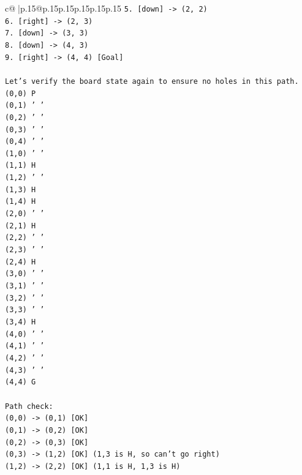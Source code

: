 \documentclass{article}
\begin{document}
{\begin{supertabular}{c@{$\;$}|p{.15\linewidth}@{}p{.15\linewidth}p{.15\linewidth}p{.15\linewidth}p{.15\linewidth}p{.15\linewidth}}
{{{\texttt{5. {[}down{]} {-}> (2, 2)} \\
\texttt{6. {[}right{]} {-}> (2, 3)} \\
\texttt{7. {[}down{]} {-}> (3, 3)} \\
\texttt{8. {[}down{]} {-}> (4, 3)} \\
\texttt{9. {[}right{]} {-}> (4, 4) {[}Goal{]}} \\
\\ 
\texttt{Let's verify the board state again to ensure no holes in this path.} \\
\texttt{(0,0) P} \\
\texttt{(0,1) ' '} \\
\texttt{(0,2) ' '} \\
\texttt{(0,3) ' '} \\
\texttt{(0,4) ' '} \\
\texttt{(1,0) ' '} \\
\texttt{(1,1) H} \\
\texttt{(1,2) ' '} \\
\texttt{(1,3) H} \\
\texttt{(1,4) H} \\
\texttt{(2,0) ' '} \\
\texttt{(2,1) H} \\
\texttt{(2,2) ' '} \\
\texttt{(2,3) ' '} \\
\texttt{(2,4) H} \\
\texttt{(3,0) ' '} \\
\texttt{(3,1) ' '} \\
\texttt{(3,2) ' '} \\
\texttt{(3,3) ' '} \\
\texttt{(3,4) H} \\
\texttt{(4,0) ' '} \\
\texttt{(4,1) ' '} \\
\texttt{(4,2) ' '} \\
\texttt{(4,3) ' '} \\
\texttt{(4,4) G} \\
\\ 
\texttt{Path check:} \\
\texttt{(0,0) {-}> (0,1) {[}OK{]}} \\
\texttt{(0,1) {-}> (0,2) {[}OK{]}} \\
\texttt{(0,2) {-}> (0,3) {[}OK{]}} \\
\texttt{(0,3) {-}> (1,2) {[}OK{]} (1,3 is H, so can't go right)} \\
\texttt{(1,2) {-}> (2,2) {[}OK{]} (1,1 is H, 1,3 is H)} \\
}}}
\end{supertabular}}
\end{document}
